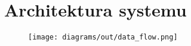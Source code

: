 \section{Architektura systemu}

\begin{figure}[H]
    \centering
    \texttt{[image: diagrams/out/data\_flow.png]}
    \caption{}
    \label{}
\end{figure}